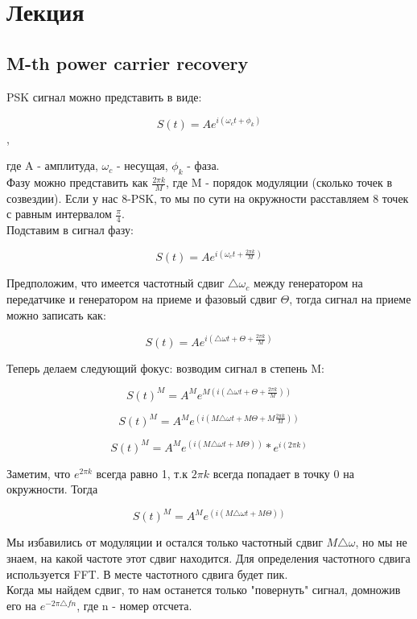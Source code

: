 \chapter{Лекция}
\label{ch:intro}

\section{M-th power carrier recovery}

PSK сигнал можно представить в виде:

$$S(t) = Ae^{i(\omega_ct+\phi_k)}$$,

где A - амплитуда, $\omega_c$ - несущая, $\phi_k$ - фаза. \\

Фазу можно представить как $\frac{2\pi k}{M}$, где M - порядок модуляции (сколько точек в созвездии). Если у нас 8-PSK, то мы 
по сути на окружности расставляем 8 точек с равным интервалом $\frac{\pi}{4}$. \\

Подставим в сигнал фазу:

$$S(t) = Ae^{i(\omega_ct+\frac{2\pi k}{M})}$$

Предположим, что имеется частотный сдвиг $\triangle \omega_c$ между генератором на передатчике и генератором на приеме и фазовый сдвиг $\Theta$, тогда сигнал на приеме можно записать как:

$$S(t) = Ae^{i(\triangle \omega t+ \Theta + \frac{2\pi k}{M})}$$

Теперь делаем следующий фокус: возводим сигнал в степень M:

$$S(t)^M = A^Me^{M(i(\triangle \omega t+ \Theta + \frac{2\pi k}{M}))}$$

$$S(t)^M = A^Me^{(i(M\triangle \omega t+ M\Theta + M\frac{2\pi k}{M}))}$$

$$S(t)^M = A^Me^{(i(M\triangle \omega t+ M\Theta))} * e^{i(2\pi k)}$$

Заметим, что $e^{2\pi k}$ всегда равно 1, т.к $2\pi k$ всегда попадает в точку 0 на окружности. Тогда

$$S(t)^M = A^Me^{(i(M\triangle \omega t+ M\Theta))}$$

Мы избавились от модуляции и остался только частотный сдвиг $M\triangle \omega$, но мы не знаем, на какой частоте этот сдвиг находится.
Для определения частотного сдвига используется FFT. В месте частотного сдвига будет пик. \\

Когда мы найдем сдвиг, то нам останется только "повернуть" сигнал, домножив его на $e^{-2\pi \triangle fn}$, где n - номер отсчета. \\

